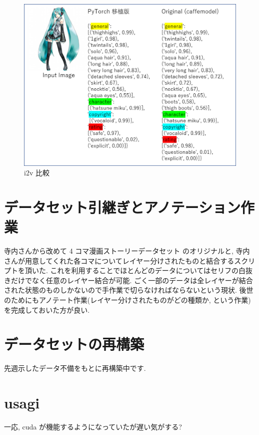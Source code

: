\documentclass{jarticle}     %
\begin{document}
\begin{figure}[!bth]
  \begin{center}
    \includegraphics[scale=0.4]{miku.png}
    \caption{i2v 比較} %
    \label{fig:miku} %
  \end{center}
\end{figure}

\section{データセット引継ぎとアノテーション作業}
寺内さんから改めて 4 コマ漫画ストーリーデータセット のオリジナルと, 寺内さんが用意してくれた各コマについてレイヤー分けされたものと結合するスクリプトを頂いた. これを利用することでほとんどのデータについてはセリフの白抜きだけでなく任意のレイヤー結合が可能. ごく一部のデータは全レイヤーが結合された状態のものしかないので手作業で切らなければならないという現状. 後世のためにもアノテート作業(レイヤー分けされたものがどの種類か, という作業)を完成しておいた方が良い.

\section{データセットの再構築}
先週示したデータ不備をもとに再構築中です.

\section{usagi}
一応, cuda が機能するようになっていたが遅い気がする?
\end{document}
